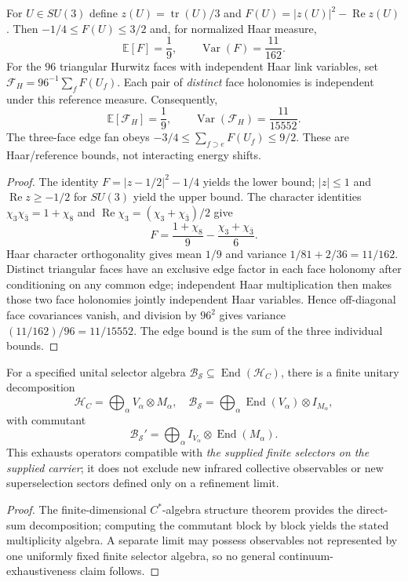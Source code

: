 \documentclass[12pt,a4paper]{article}
\begin{document}
\begin{proposition}
\label{p12:prop:v350-flux-reference-witness}
For $U\in SU(3)$ define
$z(U)=\operatorname{tr}(U)/3$ and
$F(U)=|z(U)|^2-\operatorname{Re}z(U)$.
Then $-1/4\le F(U)\le3/2$ and, for normalized Haar measure,
\[
 \boxed{\mathbb E[F]=\frac19,\qquad
        \operatorname{Var}(F)=\frac{11}{162}.}
\]
For the $96$ triangular Hurwitz faces with independent Haar
link variables, set
$\mathcal F_H=96^{-1}\sum_{f}F(U_f)$. Each pair
of \emph{distinct} face holonomies is independent under this
reference measure. Consequently,
\[
 \boxed{\mathbb E[\mathcal F_H]=\frac19,\qquad
        \operatorname{Var}(\mathcal F_H)=\frac{11}{15552}.}
\]
The three-face edge fan obeys
$-3/4\le\sum_{f\supset e}F(U_f)\le9/2$.
These are Haar/reference bounds, not interacting energy shifts.
\end{proposition}
\begin{proof}
The identity $F=|z-1/2|^2-1/4$ yields the lower bound;
$|z|\le1$ and $\operatorname{Re}z\ge-1/2$ for
$SU(3)$ yield the upper bound. The character identities
$\chi_3\chi_{\bar3}=1+\chi_8$ and
$\operatorname{Re}\chi_3=(\chi_3+\chi_{\bar3})/2$ give
\[
 F=\frac{1+\chi_8}{9}-\frac{\chi_3+\chi_{\bar3}}6.
\]
Haar character orthogonality gives mean $1/9$ and variance
$1/81+2/36=11/162$. Distinct triangular faces have an
exclusive edge factor in each face holonomy after conditioning
on any common edge; independent Haar multiplication then makes
those two face holonomies jointly independent Haar variables.
Hence off-diagonal face covariances vanish, and division by
$96^2$ gives variance $(11/162)/96=11/15552$.
The edge bound is the sum of the three individual bounds.
\end{proof}

\begin{theorem}
\label{p12:thm:v350-wedderburn-exact-scope}
For a specified unital selector algebra
$\mathcal B_{\mathcal S}\subseteq\operatorname{End}(\mathcal H_C)$,
there is a finite unitary decomposition
\[
 \mathcal H_C=\bigoplus_\alpha V_\alpha\otimes M_\alpha,
 \quad
 \mathcal B_{\mathcal S}
 =\bigoplus_\alpha\operatorname{End}(V_\alpha)\otimes I_{M_\alpha},
\]
with commutant
\[
 \boxed{\mathcal B_{\mathcal S}'
 =\bigoplus_\alpha I_{V_\alpha}\otimes\operatorname{End}(M_\alpha).}
\]
This exhausts operators compatible with \emph{the supplied
finite selectors on the supplied carrier}; it does not
exclude new infrared collective observables or new
superselection sectors defined only on a refinement limit.
\end{theorem}
\begin{proof}
The finite-dimensional $C^*$-algebra structure theorem
provides the direct-sum decomposition; computing the
commutant block by block yields the stated multiplicity
algebra. A separate limit may possess observables not
represented by one uniformly fixed finite selector algebra,
so no general continuum-exhaustiveness claim follows.
\end{proof}
\end{document}
